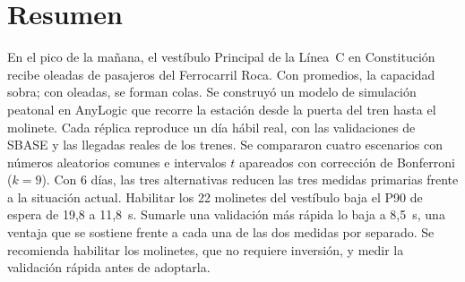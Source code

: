 \section*{Resumen}
En el pico de la mañana, el vestíbulo Principal de la Línea~C en Constitución recibe oleadas de pasajeros del
Ferrocarril Roca. Con promedios, la capacidad sobra; con oleadas, se forman colas. Se construyó un modelo de
simulación peatonal en AnyLogic que recorre la estación desde la puerta del tren hasta el molinete. Cada réplica
reproduce un día hábil real, con las validaciones de SBASE y las llegadas reales de los trenes. Se compararon
cuatro escenarios con números aleatorios comunes e intervalos $t$ apareados con corrección de Bonferroni
($k = 9$). Con 6 días, las tres alternativas reducen las tres medidas primarias frente a la situación actual.
Habilitar los 22 molinetes del vestíbulo baja el P90 de espera de 19,8 a 11,8~s. Sumarle una validación más
rápida lo baja a 8,5~s, una ventaja que se sostiene frente a cada una de las dos medidas por separado. Se recomienda habilitar
los molinetes, que no requiere inversión, y medir la validación rápida antes de adoptarla.

